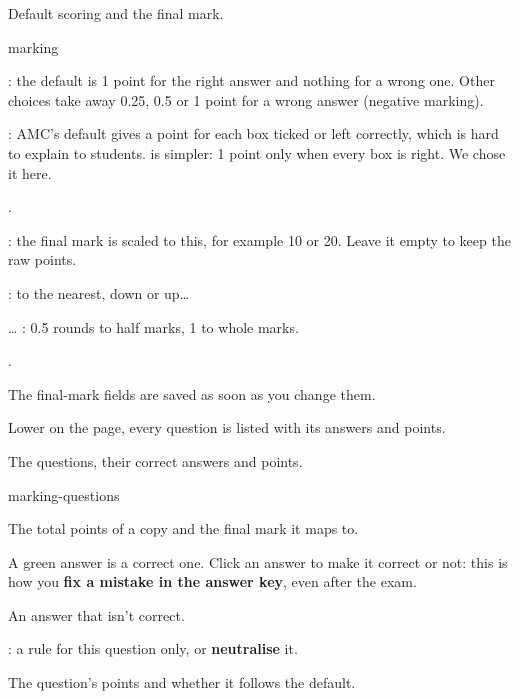 \documentclass[11pt]{article}
\begin{document}
\begin{keep}
\begin{guidefig}{Default scoring and the final mark.}
\begin{shot}{marking}
\end{shot}
\end{guidefig}
\begin{callouts}
  \item {}: the default is 1 point for the right answer and nothing for a wrong one. Other choices take away 0.25, 0.5 or 1 point for a wrong answer (negative marking).
  \item {}: AMC's default gives a point for each box ticked or left correctly, which is hard to explain to students.  is simpler: 1 point only when every box is right. We chose it here.
  \item {}.
  \item {}: the final mark is scaled to this, for example 10 or 20. Leave it empty to keep the raw points.
  \item {}: to the nearest, down or up\ldots
  \item \ldots{} : 0.5 rounds to half marks, 1 to whole marks.
  \item {}.
\end{callouts}
\end{keep}
The final-mark fields are saved as soon as you change them.

Lower on the page, every question is listed with its answers and points.

\begin{keep}
\begin{guidefig}{The questions, their correct answers and points.}
\begin{shot}[0.85\linewidth]{marking-questions}
\end{shot}
\end{guidefig}
\begin{callouts}
  \item The total points of a copy and the final mark it maps to.
  \item A green answer is a correct one. Click an answer to make it correct or not: this is how you \textbf{fix a mistake in the answer key}, even after the exam.
  \item An answer that isn't correct.
  \item {}: a rule for this question only, or \textbf{neutralise} it.
  \item The question's points and whether it follows the default.
\end{callouts}
\end{keep}
\end{document}
